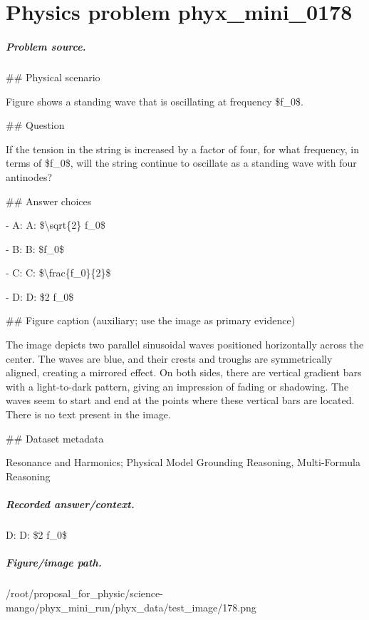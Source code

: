 
\chapter{Physics problem phyx\_mini\_0178}
\label{ch:PhyXMiniProblems_problem_phyx_mini_0178}

\paragraph{Problem source.}
\#\# Physical scenario

Figure shows a standing wave that is oscillating at frequency \$f\_0\$.

\#\# Question

If the tension in the string is increased by a factor of four, for what frequency, in terms of \$f\_0\$, will the string continue to oscillate as a standing wave with four antinodes?

\#\# Answer choices

- A: A: \$\textbackslash{}sqrt\{2\} f\_0\$

- B: B: \$f\_0\$

- C: C: \$\textbackslash{}frac\{f\_0\}\{2\}\$

- D: D: \$2 f\_0\$

\#\# Figure caption (auxiliary; use the image as primary evidence)

The image depicts two parallel sinusoidal waves positioned horizontally across the center. The waves are blue, and their crests and troughs are symmetrically aligned, creating a mirrored effect. On both sides, there are vertical gradient bars with a light-to-dark pattern, giving an impression of fading or shadowing. The waves seem to start and end at the points where these vertical bars are located. There is no text present in the image.

\#\# Dataset metadata

Resonance and Harmonics; Physical Model Grounding Reasoning, Multi-Formula Reasoning

\paragraph{Recorded answer/context.}
D: D: \$2 f\_0\$

\paragraph{Figure/image path.}
/root/proposal\_for\_physic/science-mango/phyx\_mini\_run/phyx\_data/test\_image/178.png

